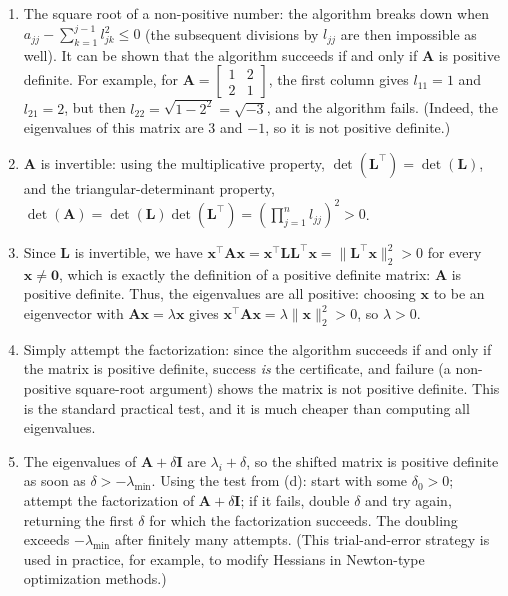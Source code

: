 \begin{solution}
    \begin{enumerate}[label=(\alph*)]
        \item The square root of a non-positive number: the algorithm breaks down when $a_{jj} - \sum_{k=1}^{j-1} l_{jk}^2 \leq 0$ (the subsequent divisions by $l_{jj}$ are then impossible as well). It can be shown that the algorithm succeeds if and only if $\mathbf{A}$ is positive definite. For example, for $\mathbf{A} = \begin{bmatrix} 1 & 2 \\ 2 & 1 \end{bmatrix}$, the first column gives $l_{11} = 1$ and $l_{21} = 2$, but then $l_{22} = \sqrt{1 - 2^2} = \sqrt{-3}$, and the algorithm fails. (Indeed, the eigenvalues of this matrix are $3$ and $-1$, so it is not positive definite.)
        \item $\mathbf{A}$ is invertible: using the multiplicative property, $\det(\mathbf{L}^\top) = \det(\mathbf{L})$, and the triangular-determinant property, $\det(\mathbf{A}) = \det(\mathbf{L})\det(\mathbf{L}^\top) = \left( \prod_{j=1}^n l_{jj} \right)^2 > 0$.
        \item Since $\mathbf{L}$ is invertible, we have $\mathbf{x}^\top \mathbf{A} \mathbf{x} = \mathbf{x}^\top \mathbf{L}\mathbf{L}^\top \mathbf{x} = \|\mathbf{L}^\top \mathbf{x}\|_2^2 > 0$ for every $\mathbf{x} \neq \mathbf{0}$, which is exactly the definition of a positive definite matrix: $\mathbf{A}$ is positive definite. Thus, the eigenvalues are all positive: choosing $\mathbf{x}$ to be an eigenvector with $\mathbf{A}\mathbf{x} = \lambda \mathbf{x}$ gives $\mathbf{x}^\top \mathbf{A} \mathbf{x} = \lambda \|\mathbf{x}\|_2^2 > 0$, so $\lambda > 0$.
        \item Simply attempt the factorization: since the algorithm succeeds if and only if the matrix is positive definite, success \emph{is} the certificate, and failure (a non-positive square-root argument) shows the matrix is not positive definite. This is the standard practical test, and it is much cheaper than computing all eigenvalues.
        \item The eigenvalues of $\mathbf{A} + \delta\mathbf{I}$ are $\lambda_i + \delta$, so the shifted matrix is positive definite as soon as $\delta > -\lambda_{\min}$. Using the test from (d): start with some $\delta_0 > 0$; attempt the factorization of $\mathbf{A} + \delta \mathbf{I}$; if it fails, double $\delta$ and try again, returning the first $\delta$ for which the factorization succeeds. The doubling exceeds $-\lambda_{\min}$ after finitely many attempts. (This trial-and-error strategy is used in practice, for example, to modify Hessians in Newton-type optimization methods.)
    \end{enumerate}
\end{solution}

